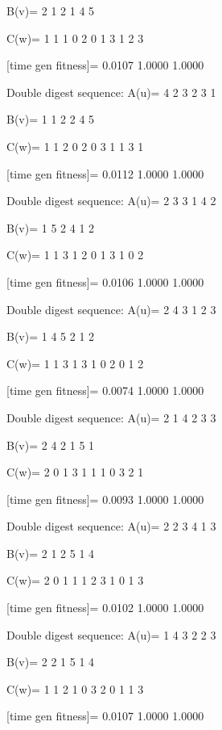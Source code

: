 B(v)=
     2     1     2     1     4     5

C(w)=
     1     1     1     0     2     0     1     3     1     2     3

[time gen fitness]=
    0.0107    1.0000    1.0000

Double digest sequence:
A(u)=
     4     2     3     2     3     1

B(v)=
     1     1     2     2     4     5

C(w)=
     1     1     2     0     2     0     3     1     1     3     1

[time gen fitness]=
    0.0112    1.0000    1.0000

Double digest sequence:
A(u)=
     2     3     3     1     4     2

B(v)=
     1     5     2     4     1     2

C(w)=
     1     1     3     1     2     0     1     3     1     0     2

[time gen fitness]=
    0.0106    1.0000    1.0000

Double digest sequence:
A(u)=
     2     4     3     1     2     3

B(v)=
     1     4     5     2     1     2

C(w)=
     1     1     3     1     3     1     0     2     0     1     2

[time gen fitness]=
    0.0074    1.0000    1.0000

Double digest sequence:
A(u)=
     2     1     4     2     3     3

B(v)=
     2     4     2     1     5     1

C(w)=
     2     0     1     3     1     1     1     0     3     2     1

[time gen fitness]=
    0.0093    1.0000    1.0000

Double digest sequence:
A(u)=
     2     2     3     4     1     3

B(v)=
     2     1     2     5     1     4

C(w)=
     2     0     1     1     1     2     3     1     0     1     3

[time gen fitness]=
    0.0102    1.0000    1.0000

Double digest sequence:
A(u)=
     1     4     3     2     2     3

B(v)=
     2     2     1     5     1     4

C(w)=
     1     1     2     1     0     3     2     0     1     1     3

[time gen fitness]=
    0.0107    1.0000    1.0000

